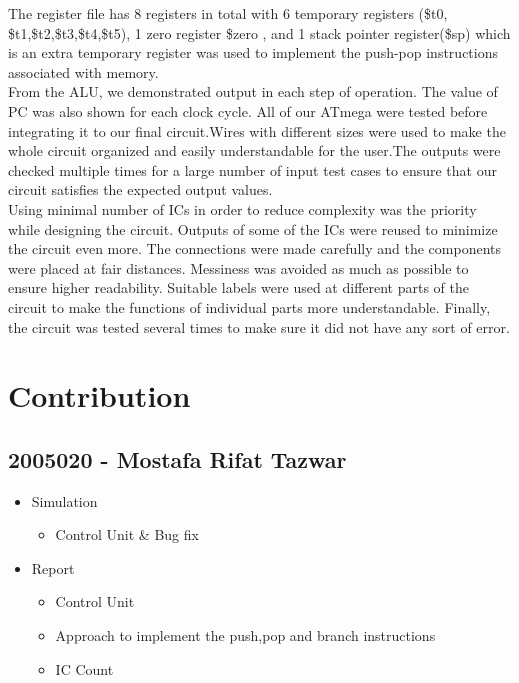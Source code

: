 \documentclass[12]{article}
\begin{document}
The register file has 8 registers in total with 6 temporary registers (\$t0, \$t1,\$t2,\$t3,\$t4,\$t5), 1 zero register \$zero , and 1 
stack pointer register(\$sp) which is an extra temporary register was used to implement the push-pop instructions 
associated with memory.\\
From the ALU, we demonstrated output in each step of operation.
The value of PC was also shown for each clock cycle. All of our ATmega were tested before integrating it to our final circuit.Wires with different sizes were used to make the whole circuit organized and easily
understandable for the user.The outputs were checked multiple times for a large number of input test cases to
ensure that our circuit satisfies the expected output values.\\
Using minimal number of ICs in order to reduce complexity was the priority while designing the 
circuit. Outputs of some of the ICs were reused to minimize the circuit 
even more. The connections were made carefully and the components were placed at fair distances. 
Messiness was avoided as much as possible to ensure higher readability. Suitable labels were 
used at different parts of the circuit to make the functions of individual parts more 
understandable. Finally, the circuit was tested several times to make sure it did not have any sort 
of error.

\section{Contribution}
\subsection*{2005020 - Mostafa Rifat Tazwar}
\begin{itemize}
    \item Simulation
    \begin{itemize}
        \item Control Unit \& Bug fix
    \end{itemize}
    \item Report
    \begin{itemize}
        \item Control Unit
        \item Approach to implement the push,pop and branch instructions 
        \item IC Count
    \end{itemize}
\end{itemize}
\end{document}

